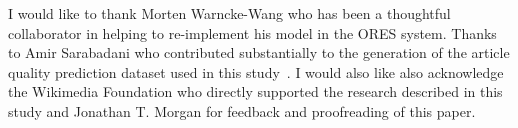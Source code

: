 I would like to thank Morten Warncke-Wang who has been a thoughtful collaborator in helping to re-implement his model in the ORES system. Thanks to Amir Sarabadani who contributed substantially to the generation of the article quality prediction dataset used in this study~\cite{halfaker16monthly}. I would also like also acknowledge the Wikimedia Foundation who directly supported the research described in this study and Jonathan T. Morgan for feedback and proofreading of this paper.
